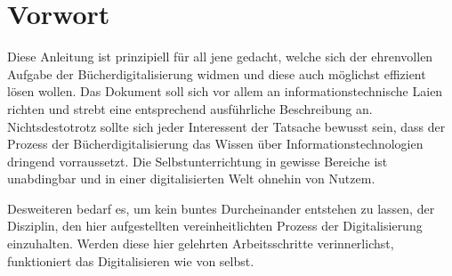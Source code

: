 
\section{Vorwort}

Diese Anleitung ist prinzipiell für all jene gedacht, welche sich
der ehrenvollen Aufgabe der Bücherdigitalisierung widmen und diese
auch möglichst effizient lösen wollen. Das Dokument soll sich vor
allem an informationstechnische Laien richten und strebt eine entsprechend
ausführliche Beschreibung an. Nichtsdestotrotz sollte sich jeder Interessent
der Tatsache bewusst sein, dass der Prozess der Bücherdigitalisierung
das Wissen über Informationstechnologien dringend vorraussetzt. Die
Selbstunterrichtung in gewisse Bereiche ist unabdingbar und in einer
digitalisierten Welt ohnehin von Nutzem.

Desweiteren bedarf es, um kein buntes Durcheinander entstehen zu lassen,
der Disziplin, den hier aufgestellten vereinheitlichten Prozess der
Digitalisierung einzuhalten. Werden diese hier gelehrten Arbeitsschritte
verinnerlichst, funktioniert das Digitalisieren wie von selbst. 
